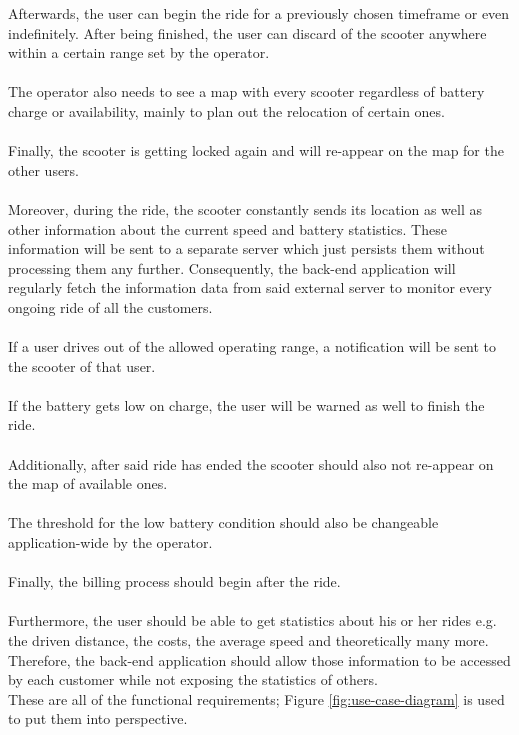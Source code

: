 \documentclass[12pt,a4paper]{report}
\begin{document}
Afterwards, the user can begin the ride for a previously chosen timeframe
or even indefinitely. After being finished, the user can discard of the scooter
anywhere within a certain range set by the operator.\\\\
The operator also needs to see a map with every scooter regardless of battery
charge or availability, mainly to plan out the relocation of certain ones.\\\\
Finally, the scooter is getting locked again and will re-appear on the map for the other users.\\\\
Moreover, during the ride, the scooter constantly sends its location as well
as other information about the current speed and battery statistics.
These information will be sent to a separate server which just persists them
without processing them any further.
Consequently, the back-end application will regularly fetch the information data
from said external server to monitor every ongoing ride of all the customers.\\\\
If a user drives out of the allowed operating range, a notification will be sent
to the scooter of that user.\\\\
If the battery gets low on charge, the user will be warned as well to finish the ride.\\\\
Additionally, after said ride has ended the scooter should also not re-appear
on the map of available ones.\\\\
The threshold for the low battery condition should also be changeable
application-wide by the operator.\\\\
Finally, the billing process should begin after the ride.\\\\
Furthermore, the user should be able to get statistics about his or her rides
e.g. the driven distance, the costs, the average speed and theoretically
many more. Therefore, the back-end application should allow those information
to be accessed by each customer while not exposing the statistics of others.\\

These are all of the functional requirements;
Figure \ref{fig:use-case-diagram} is used to put them into perspective.\\
\end{document}
